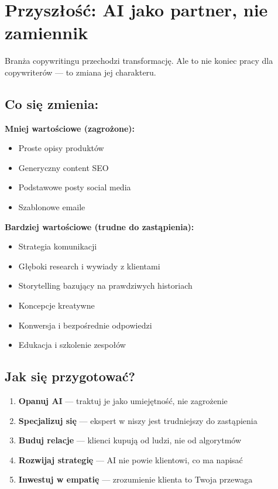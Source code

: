 \documentclass[
  12pt,
  a4paper,
  twoside,
  openright,
  12pt,
  DIV=12,
  BCOR=12mm]{scrbook}
\providecommand{\tightlist}{%
  \setlength{\itemsep}{0pt}\setlength{\parskip}{0pt}}\usepackage{longtable,booktabs,array}
\begin{document}
\section{Przyszłość: AI jako partner, nie
zamiennik}\label{przyszux142oux15bux107-ai-jako-partner-nie-zamiennik}

Branża copywritingu przechodzi transformację. Ale to nie koniec pracy
dla copywriterów --- to zmiana jej charakteru.

\subsection{Co się zmienia:}\label{co-siux119-zmienia}

\textbf{Mniej wartościowe (zagrożone):}

\begin{itemize}
\tightlist
\item
  Proste opisy produktów
\item
  Generyczny content SEO
\item
  Podstawowe posty social media
\item
  Szablonowe emaile
\end{itemize}

\textbf{Bardziej wartościowe (trudne do zastąpienia):}

\begin{itemize}
\tightlist
\item
  Strategia komunikacji
\item
  Głęboki research i wywiady z klientami
\item
  Storytelling bazujący na prawdziwych historiach
\item
  Koncepcje kreatywne
\item
  Konwersja i bezpośrednie odpowiedzi
\item
  Edukacja i szkolenie zespołów
\end{itemize}

\subsection{Jak się przygotować?}\label{jak-siux119-przygotowaux107}

\begin{enumerate}
\def\labelenumi{\arabic{enumi}.}
\tightlist
\item
  \textbf{Opanuj AI} --- traktuj je jako umiejętność, nie zagrożenie
\item
  \textbf{Specjalizuj się} --- ekspert w niszy jest trudniejszy do
  zastąpienia
\item
  \textbf{Buduj relacje} --- klienci kupują od ludzi, nie od algorytmów
\item
  \textbf{Rozwijaj strategię} --- AI nie powie klientowi, co ma napisać
\item
  \textbf{Inwestuj w empatię} --- zrozumienie klienta to Twoja przewaga
\end{enumerate}
\end{document}

